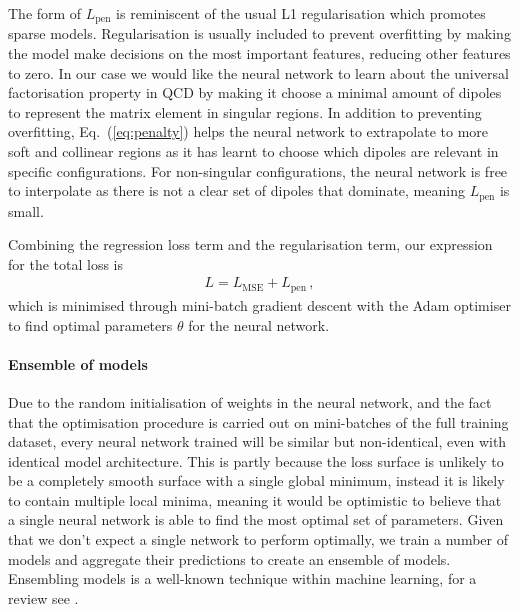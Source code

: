 \documentclass[main.tex]{subfiles}
\begin{document}
The form of $L_{\mathrm{pen}}$ is reminiscent of the usual L1 regularisation which promotes sparse models.
Regularisation is usually included to prevent overfitting by making the model make decisions on the most important features, reducing other features to zero.
In our case we would like the neural network to learn about the universal factorisation property in QCD by making it choose a minimal amount of dipoles to represent the matrix element in singular regions.
In addition to preventing overfitting, Eq.~(\ref{eq:penalty}) helps the neural network to extrapolate to more soft and collinear regions as it has learnt to choose which dipoles are relevant in specific configurations.
For non-singular configurations, the neural network is free to interpolate as there is not a clear set of dipoles that dominate, meaning $L_{\mathrm{pen}}$ is small.

Combining the regression loss term and the regularisation term, our expression for the total loss is
\begin{eqnarray}\label{eq:loss}
    L = L_{\mathrm{MSE}} + L_{\mathrm{pen}} \, ,
\end{eqnarray}
which is minimised through mini-batch gradient descent \cite{bottou2018optimization} with the Adam optimiser \cite{Kingma:2014vow} to find optimal parameters $\theta$ for the neural network.

\paragraph*{Ensemble of models}
Due to the random initialisation of weights in the neural network, and the fact that the optimisation procedure is carried out on mini-batches of the full training dataset, every neural network trained will be similar but non-identical, even with identical model architecture.
This is partly because the loss surface is unlikely to be a completely smooth surface with a single global minimum, instead it is likely to contain multiple local minima, meaning it would be optimistic to believe that a single neural network is able to find the most optimal set of parameters.
Given that we don't expect a single network to perform optimally, we train a number of models and aggregate their predictions to create an ensemble of models.
Ensembling models is a well-known technique within machine learning, for a review see \cite{ZHOU2002239}.
\end{document}

